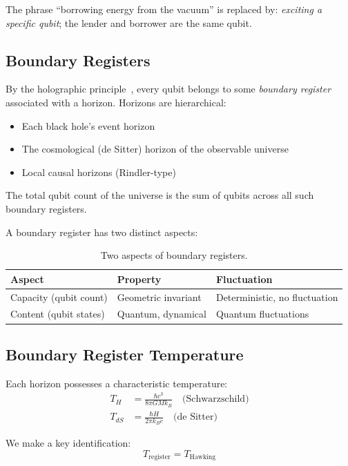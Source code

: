 \documentclass[11pt,a4paper]{article}
\begin{document}
The phrase ``borrowing energy from the vacuum'' is replaced by: \emph{exciting a specific qubit}; the lender and borrower are the same qubit.

\subsection{Boundary Registers}

By the holographic principle~\cite{tHooft1993,Susskind1995}, every qubit belongs to some \emph{boundary register} associated with a horizon. Horizons are hierarchical:
\begin{itemize}[leftmargin=*]
\item Each black hole's event horizon
\item The cosmological (de Sitter) horizon of the observable universe
\item Local causal horizons (Rindler-type)
\end{itemize}

The total qubit count of the universe is the sum of qubits across all such boundary registers.

A boundary register has two distinct aspects:

\begin{table}[h]
\centering
\begin{tabular}{lll}
\toprule
\textbf{Aspect} & \textbf{Property} & \textbf{Fluctuation} \\
\midrule
Capacity (qubit count) & Geometric invariant & Deterministic, no fluctuation \\
Content (qubit states) & Quantum, dynamical & Quantum fluctuations \\
\bottomrule
\end{tabular}
\caption{Two aspects of boundary registers.}
\end{table}

\subsection{Boundary Register Temperature}

Each horizon possesses a characteristic temperature:
\begin{align}
T_H &= \frac{\hbar c^3}{8\pi G M k_B} \quad \text{(Schwarzschild)} \\
T_{dS} &= \frac{\hbar H}{2\pi k_B c} \quad \text{(de Sitter)}
\end{align}

We make a key identification:
\begin{equation}
\boxed{T_{\text{register}} = T_{\text{Hawking}}}
\end{equation}
\end{document}
